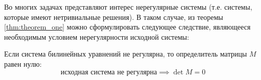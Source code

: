 Во многих задачах представляют интерес нерегулярные системы (т.е. системы, которые имеют нетривиальные 
решения). В таком случае, из теоремы \ref{thm:theorem_one} можно сформулировать следующее следствие, 
являющееся необходимым условием нерегулярности исходной системы:

\begin{consequence}
	Если система билинейных уравнений не регулярна, то определитель матрицы $M$ равен нулю:
	$$
	\text{исходная система не регулярна} \implies \det M = 0 
	$$
\end{consequence}



              
